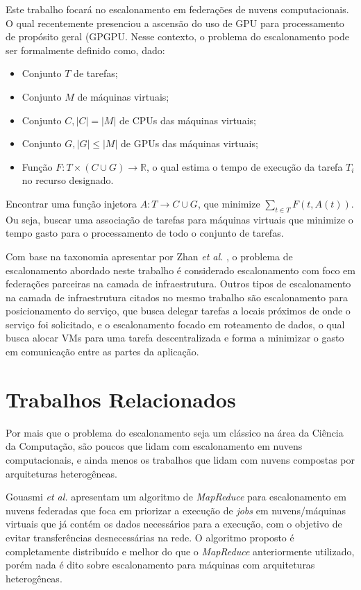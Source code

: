 Este trabalho focará no escalonamento em federações de nuvens computacionais. O qual recentemente presenciou a ascensão do uso de \acrfull{GPU} para processamento de propósito geral (\acrfull{GPGPU}\cite{Dimitrov:2009:USA:1513895.1513907}\cite{Yang:2010:GCM:1809028.1806606}. Nesse contexto, o problema do escalonamento pode ser formalmente definido como, dado:

\begin{itemize}
	\item Conjunto $T$ de tarefas;
	\item Conjunto $M$ de máquinas virtuais;
	\item Conjunto $C, |C| = |M|$ de CPUs das máquinas virtuais;
	\item Conjunto $G,  |G| \le |M|$ de GPUs das máquinas virtuais;
	\item Função $F: T \times (C \cup G) \to \mathbb{R}$, o qual estima o tempo de execução da tarefa $T_{i}$ no recurso designado.
\end{itemize}
Encontrar uma função injetora $A: T \to C \cup G$, que minimize $\sum_{t \in T} F(t, A(t) )$. Ou seja, buscar uma associação de tarefas para máquinas virtuais que minimize o tempo gasto para o processamento de todo o conjunto de tarefas.

Com base na taxonomia apresentar por Zhan \textit{et al.} \cite{Zhan:2015:CCR:2775083.2788397}, o problema de escalonamento abordado neste trabalho é considerado escalonamento com foco em federações parceiras na camada de infraestrutura. Outros tipos de escalonamento na camada de infraestrutura citados no mesmo trabalho são escalonamento para posicionamento do serviço, que busca delegar tarefas a locais próximos de onde o serviço foi solicitado, e o escalonamento focado em roteamento de dados, o qual busca alocar \acrshort{VM}s para uma tarefa descentralizada e forma a minimizar o gasto em comunicação entre as partes da aplicação.

\section{Trabalhos Relacionados}

Por mais que o problema do escalonamento seja um clássico na área da Ciência da Computação, são poucos que lidam com escalonamento em nuvens computacionais, e ainda menos os trabalhos que lidam com nuvens compostas por arquiteturas heterogêneas. 

Gouasmi \textit{et al.} \cite{MapReduce_sched_8034997} apresentam um algoritmo de \textit{MapReduce}\cite{Dean:2008:MSD:1327452.1327492} para escalonamento em nuvens federadas que foca em priorizar a execução de \textit{jobs} em nuvens/máquinas virtuais que já contém os dados necessários para a execução, com o objetivo de evitar transferências desnecessárias na rede. O algoritmo proposto é completamente distribuído e melhor do que o \textit{MapReduce} anteriormente utilizado, porém nada é dito sobre escalonamento para máquinas com arquiteturas heterogêneas.


